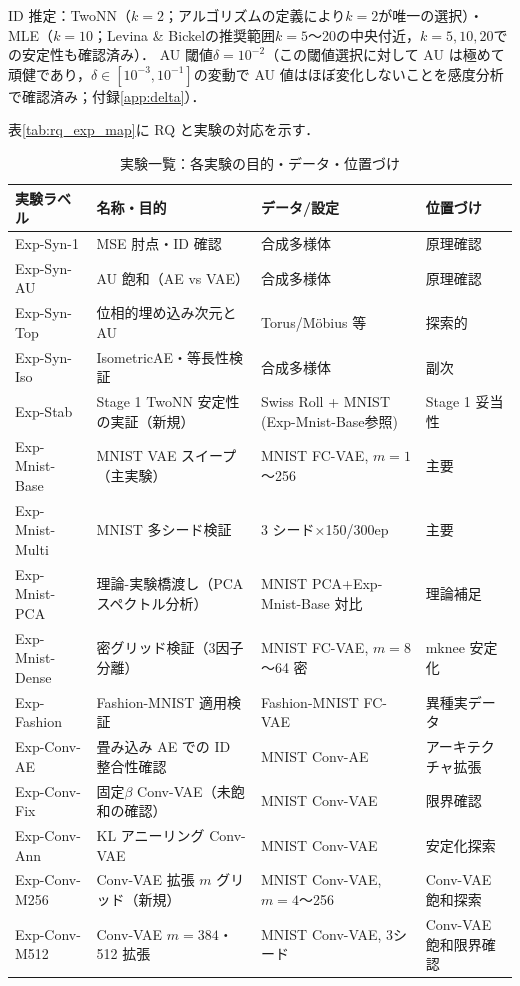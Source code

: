 \documentclass[11pt,a4paper]{jsarticle}
\begin{document}
ID 推定：TwoNN（$k=2$；アルゴリズムの定義により$k=2$が唯一の選択）・MLE（$k=10$；Levina \& Bickel\cite{levina2005mle}の推奨範囲$k=5$〜20の中央付近，$k=5,10,20$での安定性も確認済み）\cite{facco2017twonn,levina2005mle}．
AU 閾値$\delta = 10^{-2}$\cite{lucas2019elbo}（この閾値選択に対して AU は極めて頑健であり，$\delta \in [10^{-3}, 10^{-1}]$の変動で AU 値はほぼ変化しないことを感度分析で確認済み；付録\ref{app:delta}）．

表\ref{tab:rq_exp_map}に RQ と実験の対応を示す．

\begin{table}[H]
\centering
\caption{実験一覧：各実験の目的・データ・位置づけ}
\label{tab:exp_list}
\small
\begin{tabular}{llll}
\toprule
実験ラベル & 名称・目的 & データ/設定 & 位置づけ \\
\midrule
Exp-Syn-1 & MSE 肘点・ID 確認 & 合成多様体 & 原理確認 \\
Exp-Syn-AU & AU 飽和（AE vs VAE） & 合成多様体 & 原理確認 \\
Exp-Syn-Top & 位相的埋め込み次元と AU & Torus/Möbius 等 & 探索的 \\
Exp-Syn-Iso & IsometricAE・等長性検証 & 合成多様体 & 副次 \\
Exp-Stab & Stage 1 TwoNN 安定性の実証（新規） & Swiss Roll + MNIST (Exp-Mnist-Base参照) & Stage 1 妥当性 \\
Exp-Mnist-Base & MNIST VAE スイープ（主実験） & MNIST FC-VAE, $m=1$〜256 & 主要 \\
Exp-Mnist-Multi & MNIST 多シード検証 & 3 シード×150/300ep & 主要 \\
Exp-Mnist-PCA & 理論-実験橋渡し（PCA スペクトル分析） & MNIST PCA+Exp-Mnist-Base 対比 & 理論補足 \\
Exp-Mnist-Dense & 密グリッド検証（3因子分離） & MNIST FC-VAE, $m=8$〜64 密 & mknee 安定化 \\
Exp-Fashion & Fashion-MNIST 適用検証 & Fashion-MNIST FC-VAE & 異種実データ \\
Exp-Conv-AE & 畳み込み AE での ID 整合性確認 & MNIST Conv-AE & アーキテクチャ拡張 \\
Exp-Conv-Fix & 固定$\beta$ Conv-VAE（未飽和の確認） & MNIST Conv-VAE & 限界確認 \\
Exp-Conv-Ann & KL アニーリング Conv-VAE & MNIST Conv-VAE & 安定化探索 \\
Exp-Conv-M256 & Conv-VAE 拡張 $m$ グリッド（新規） & MNIST Conv-VAE, $m=4$〜256 & Conv-VAE 飽和探索 \\
Exp-Conv-M512 & Conv-VAE $m=384$・512 拡張 & MNIST Conv-VAE, 3シード & Conv-VAE 飽和限界確認 \\

\end{tabular}
\end{table}
\end{document}
